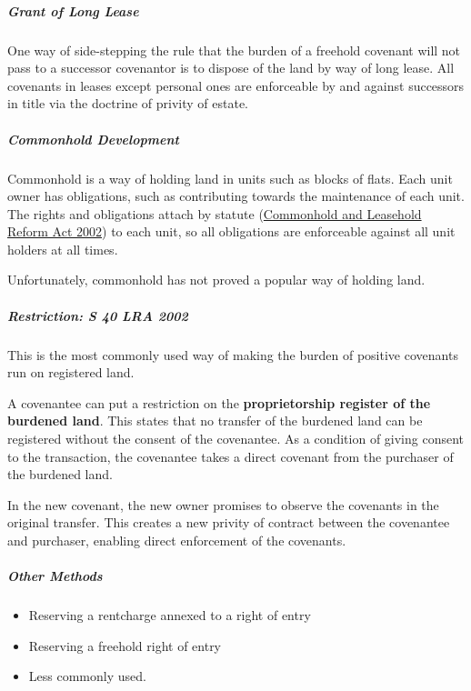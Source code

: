 \documentclass[
]{article}
\newenvironment{Shaded}{}{}
\newcommand{\NormalTok}[1]{#1}
\providecommand{\tightlist}{%
  \setlength{\itemsep}{0pt}\setlength{\parskip}{0pt}}
\begin{document}
\hypertarget{grant-of-long-lease}{%
\subparagraph{Grant of Long Lease}\label{grant-of-long-lease}}

One way of side-stepping the rule that the burden of a freehold covenant
will not pass to a successor covenantor is to dispose of the land by way
of long lease. All covenants in leases except personal ones are
enforceable by and against successors in title via the doctrine of
privity of estate.

\hypertarget{commonhold-development}{%
\subparagraph{Commonhold Development}\label{commonhold-development}}

Commonhold is a way of holding land in units such as blocks of flats.
Each unit owner has obligations, such as contributing towards the
maintenance of each unit. The rights and obligations attach by statute
(\href{https://www.legislation.gov.uk/ukpga/2002/15/contents}{Commonhold
and Leasehold Reform Act 2002}) to each unit, so all obligations are
enforceable against all unit holders at all times.

Unfortunately, commonhold has not proved a popular way of holding land.

\hypertarget{restriction-s-40-lra-2002}{%
\subparagraph{Restriction: S 40 LRA
2002}\label{restriction-s-40-lra-2002}}

\begin{Shaded}
\begin{Highlighting}[]
\NormalTok{This is the most commonly used way of making the burden of positive covenants run on registered land.}
\end{Highlighting}
\end{Shaded}

A covenantee can put a restriction on the \textbf{proprietorship
register of the burdened land}. This states that no transfer of the
burdened land can be registered without the consent of the covenantee.
As a condition of giving consent to the transaction, the covenantee
takes a direct covenant from the purchaser of the burdened land.

In the new covenant, the new owner promises to observe the covenants in
the original transfer. This creates a new privity of contract between
the covenantee and purchaser, enabling direct enforcement of the
covenants.

\hypertarget{other-methods}{%
\subparagraph{Other Methods}\label{other-methods}}

\begin{itemize}
\tightlist
\item
  Reserving a rentcharge annexed to a right of entry
\item
  Reserving a freehold right of entry
\item
  Less commonly used.
\end{itemize}
\end{document}
